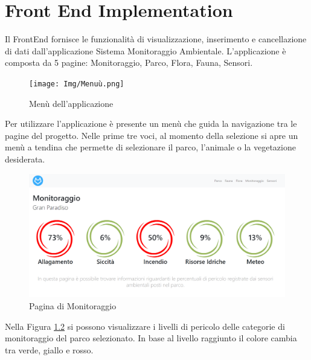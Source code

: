 \chapter{Front End Implementation}

Il FrontEnd fornisce le funzionalità di visualizzazione, inserimento e cancellazione di dati dall'applicazione Sistema Monitoraggio Ambientale. L'applicazione è composta da 5 pagine: Monitoraggio, Parco, Flora, Fauna, Sensori.

\begin{figure}[ht]   
\centering
\texttt{[image: Img/Menuù.png]}
    \caption{Menù dell'applicazione}
    \label{Menu}
\end{figure}

Per utilizzare l'applicazione è presente un menù che guida la navigazione tra le pagine del progetto. Nelle prime tre voci, al momento della selezione si apre un menù a tendina che permette di selezionare il parco, l'animale o la vegetazione desiderata.

\begin{figure}[ht]   
\centering
\includegraphics[scale=0.45]{Img/Monitoraggio.png}
    \caption{Pagina di Monitoraggio}
    \label{Monitoraggio}
\end{figure}


Nella Figura \ref{Monitoraggio} si possono visualizzare i livelli di pericolo delle categorie di monitoraggio del parco selezionato. In base al livello raggiunto il colore cambia tra verde, giallo e rosso.

